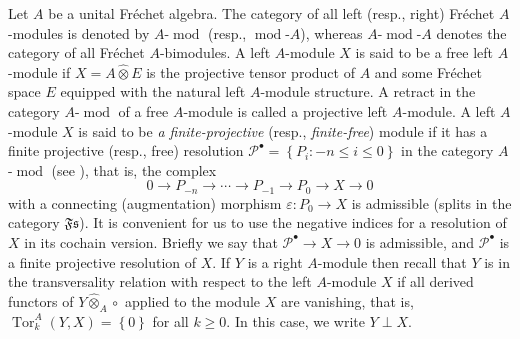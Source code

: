 \documentclass[12pt]{amsart}%
\theoremstyle{plain}
\numberwithin{equation}{section}
\numberwithin{equation}{section}
\numberwithin{theorem}{section}
\numberwithin{lemma}{section}
\numberwithin{remark}{section}
\numberwithin{example}{section}
\numberwithin{proposition}{section}
\numberwithin{definition}{section}
\numberwithin{corollary}{section}
\begin{document}
Let $A$ be a unital Fr\'{e}chet algebra. The category of all left (resp.,
right) Fr\'{e}chet $A$-modules is denoted by $A$-$\operatorname{mod}$ (resp.,
$\operatorname{mod}$-$A$), whereas $A$-$\operatorname{mod}$-$A$ denotes the
category of all Fr\'{e}chet $A$-bimodules. A left $A$-module $X$ is said to be
a free left $A$-module if $X=A\widehat{\otimes}E$ is the projective tensor
product of $A$ and some Fr\'{e}chet space $E$ equipped with the natural left
$A$-module structure. A retract in the category $A$-$\operatorname*{mod}$ of a
free $A$-module is called a projective left $A$-module. A left $A$-module $X$
is said to be \textit{a finite-projective} (resp., \textit{finite-free})
module if it has a finite projective (resp., free) resolution $\mathcal{P}%
^{\bullet}=\left\{  P_{i}:-n\leq i\leq0\right\}  $ in the category
$A$-$\operatorname{mod}$ (see \cite[3.2]{HelHom}), that is, the complex
\[
0\rightarrow P_{-n}\rightarrow\cdots\rightarrow P_{-1}\rightarrow
P_{0}\rightarrow X\rightarrow0
\]
with a connecting (augmentation) morphism $\varepsilon:P_{0}\rightarrow X$ is
admissible (splits in the category $\mathfrak{Fs}$). It is convenient for us
to use the negative indices for a resolution of $X$ in its cochain version.
Briefly we say that $\mathcal{P}^{\bullet}\rightarrow X\rightarrow0$ is
admissible, and $\mathcal{P}^{\bullet}$ is a finite projective resolution of
$X$. If $Y$ is a right $A$-module then recall \cite[3.3.1]{HelHom} that $Y$ is
in the transversality relation with respect to the left $A$-module $X$ if all
derived functors of $Y\widehat{\otimes}_{A}\circ$ applied to the module $X$
are vanishing, that is, $\operatorname{Tor}_{k}^{A}\left(  Y,X\right)
=\left\{  0\right\}  $ for all $k\geq0$. In this case, we write $Y\perp X$.
\end{document}
